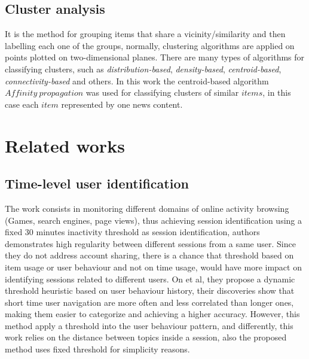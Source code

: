 \documentclass[ecp,tc,english]{iiufrgs}
\begin{document}
        \subsection{Cluster analysis}
        It is the method for grouping items that share a vicinity/similarity and then labelling each one of the groups, normally, clustering algorithms are applied on points plotted on two-dimensional planes. There are many types of algorithms for classifying clusters, such as \textit{distribution-based}, \textit{density-based}, \textit{centroid-based}, \textit{connectivity-based} and others. In this work the centroid-based algorithm \(Affinity\ propagation\) was used for classifying clusters of similar \(items\), in this case each \(item\) represented by one news content.

\section{Related works}
        
    \subsection{Time-level user identification}
    The work \cite{10.1145/2736277.2741117} consists in monitoring different domains of online activity browsing (Games, search engines, page views), thus achieving session identification using a fixed 30 minutes inactivity threshold as session identification, authors demonstrates high regularity between different sessions from a same user. 
    Since they do not address account sharing, there is a chance that threshold based on item usage or user behaviour and not on time usage, would have more impact on identifying sessions related to different users.
    On \cite{JINDAL2020} et al, they propose a dynamic threshold heuristic based on user behaviour history, their discoveries show that short time user navigation are more often and less correlated than longer ones, making them easier to categorize and achieving a higher accuracy. However, this method apply a threshold into the user behaviour pattern, and differently, this work relies on the distance between topics inside a session, also the proposed method uses fixed threshold for simplicity reasons.
\end{document}
